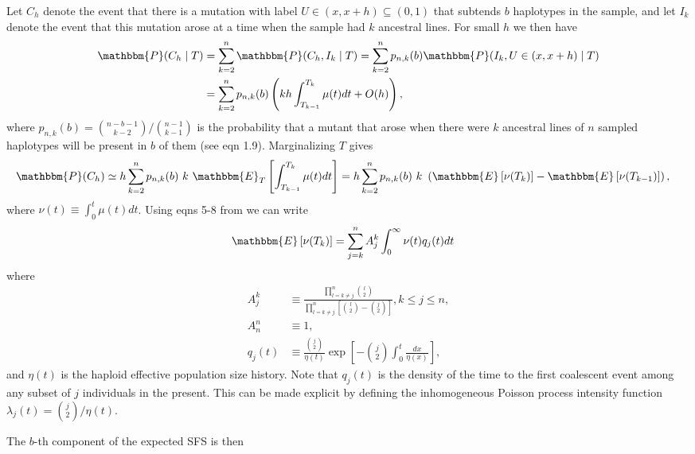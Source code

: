 \documentclass[11pt]{article}
\begin{document}
Let $C_h$ denote the event that there is a mutation with label $U\in(x,x+h)\subseteq(0,1)$ that subtends $b$ haplotypes in the sample, and let $I_k$ denote the event that this mutation arose at a time when the sample had $k$ ancestral lines.
For small $h$ we then have
\begin{align*}
\mathbbm{P}(C_h\mid T) &= \sum_{k=2}^n \mathbbm{P}(C_h, I_k\mid T) = \sum_{k=2}^n p_{n,k}(b)\mathbbm{P}(I_k, U\in(x,x+h)\mid T)\\
&= \sum_{k=2}^n p_{n,k}(b)\left(kh\int_{T_{k-1}}^{T_k}\mu(t)dt + O(h)\right),
\end{align*}
where $p_{n,k}(b) = \binom{n-b-1}{k-2}/\binom{n-1}{k-1}$ is the probability that a mutant that arose when there were $k$ ancestral lines of $n$ sampled haplotypes will be present in $b$ of them (see \cite{Griffiths1998-qf} eqn 1.9).
Marginalizing $T$ gives
\begin{align*}
\mathbbm{P}(C_h) &\simeq h\sum_{k=2}^n p_{n,k}(b)\ k\ \mathbbm{E}_T\left[\int_{T_{k-1}}^{T_k}\mu(t)dt\right] = h\sum_{k=2}^n p_{n,k}(b)\ k\ \left(\mathbbm{E}\left[\nu(T_{k})\right] - \mathbbm{E}\left[\nu(T_{k-1})\right]\right),
\end{align*}
where $\nu(t)\equiv\int_0^t\mu(t)dt$.
Using eqns 5-8 from \cite{Polanski2003-kg} we can write
\begin{align*}
\mathbbm{E}\left[\nu(T_{k})\right] &= \sum_{j=k}^n A_j^k\int_0^\infty\nu(t)q_j(t)dt
\end{align*}
where
\begin{align*}
A_j^k &\equiv \frac{\prod_{l=k\ne j}^{n}\binom{l}{2}}{\prod_{l=k\ne j}^{n}\left[\binom{l}{2}-\binom{j}{2}\right]}, k\le j\le n,\\
A_n^n &\equiv 1,\\
q_j(t) &\equiv \frac{\binom{j}{2}}{\eta(t)}\exp\left[-\binom{j}{2}\int_0^t\frac{dx}{\eta(x)}\right],
\end{align*}
and $\eta(t)$ is the haploid effective population size history.
Note that $q_j(t)$ is the density of the time to the first coalescent event among any subset of $j$ individuals in the present.
This can be made explicit by defining the inhomogeneous Poisson process intensity function $\lambda_j(t) = \binom{j}{2}/\eta(t)$.

The $b$-th component of the expected SFS is then
\end{document}
